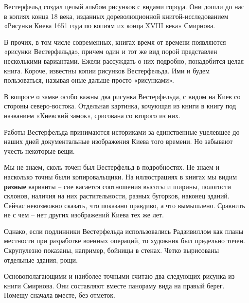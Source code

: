 Вестерфельд создал целый альбом рисунков с видами города. Они дошли до нас в копиях конца 18 века, изданных дореволюционной книгой-исследованием «Рисунки Киева 1651 года по копиям их конца XVIII века» Смирнова.

В прочих, в том числе современных, книгах время от времени появляются «рисунки Вестерфельда», причем один и тот же вид порой представлен несколькими вариантами. Ежели рассуждать о них подробно, понадобится целая книга. Короче, известны копии рисунков Вестерфельда. Ими и будем пользоваться, называя оные дальше просто «рисунками».

В вопросе о замке особо важны два рисунка Вестерфельда, с видом на Киев со стороны северо-востока. Отдельная картинка, кочующая из книги в книгу под названием «Киевский замок», срисована со второго из них.

Работы Вестерфельда принимаются историками за единственные уцелевшее до наших дней документальные изображения Киева того времени. Но забывают учесть некоторые вещи.

Мы не знаем, сколь точен был Вестерфельд в подробностях. Не знаем и насколько точны были копировальщики. На иллюстрациях в книгах мы видим \textbf{разные} варианты – сие касается соотношения высоты и ширины, пологости склонов, наличия на них растительности, разных бугорков, наконец зданий. Сейчас невозможно сказать, что показано правдиво, а что вымышлено. Сравнить не с чем – нет других изображений Киева тех же лет.

Однако, если подлинники Вестерфельда использовались Радзивиллом как планы местности при разработке военных операций, то художник был предельно точен. Скрупулезно показаны, например, бойницы в стенах. Четко вырисованы отдельные здания, рощи.



Основополагающими и наиболее точными считаю два следующих рисунка из книги Смирнова. Они составляют вместе панораму вида на правый берег. Помещу сначала вместе, без отметок.


